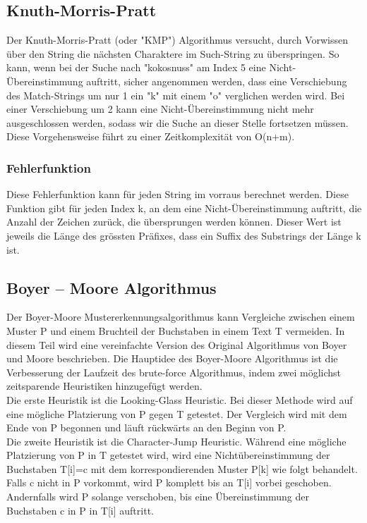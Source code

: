 \documentclass[14pt]{article}
\begin{document}
\subsection{Knuth-Morris-Pratt}
Der Knuth-Morris-Pratt (oder "KMP") Algorithmus versucht, durch Vorwissen über den String die nächsten Charaktere im Such-String zu überspringen. So kann, wenn bei der Suche nach "kokosnuss" am Index 5 eine Nicht-Übereinstimmung auftritt, sicher angenommen werden, dass eine Verschiebung des Match-Strings um nur 1 ein "k" mit einem "o" verglichen werden wird. Bei einer Verschiebung um 2 kann eine Nicht-Übereinstimmung
nicht mehr ausgeschlossen werden, sodass wir die Suche an dieser Stelle fortsetzen müssen. Diese Vorgehensweise führt zu einer Zeitkomplexität von O(n+m).

\subsubsection{Fehlerfunktion}
Diese Fehlerfunktion kann für jeden String im vorraus berechnet werden. Diese Funktion gibt für jeden Index k, an dem eine Nicht-Übereinstimmung auftritt, die Anzahl der Zeichen zurück, die übersprungen werden können. Dieser Wert ist jeweils die Länge des grössten Präfixes, dass ein Suffix des Substrings der Länge k ist.

\subsection{Boyer – Moore Algorithmus}
Der Boyer-Moore Mustererkennungsalgorithmus kann Vergleiche zwischen einem Muster P und einem Bruchteil der Buchstaben in einem Text T vermeiden. In diesem Teil wird eine vereinfachte Version des Original Algorithmus von Boyer und Moore beschrieben.
Die Hauptidee des Boyer-Moore Algorithmus ist die Verbesserung der Laufzeit  des brute-force Algorithmus, indem zwei möglichst zeitsparende Heuristiken hinzugefügt werden. \\

Die erste Heuristik ist die Looking-Glass Heuristic. Bei dieser Methode wird auf eine mögliche Platzierung von P gegen T getestet. Der Vergleich wird mit dem Ende von P begonnen und läuft rückwärts an den Beginn von P.\\

Die zweite Heuristik ist die Character-Jump Heuristic. Während eine mögliche Platzierung von P in T getestet wird, wird eine Nichtübereinstimmung der Buchstaben T[i]=c  mit dem korrespondierenden Muster P[k] wie folgt behandelt. Falls c nicht in P vorkommt, wird P komplett bis an T[i] vorbei geschoben. Andernfalls wird P solange verschoben, bis eine Übereinstimmung der Buchstaben c in P in T[i] auftritt.\\
\end{document}
